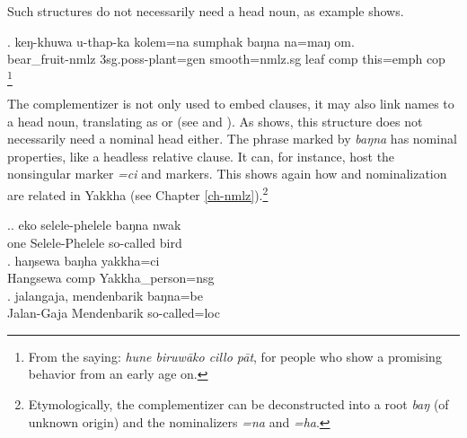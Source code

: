 Such structures do not necessarily need a head noun, as example \Next shows.

\exg. keŋ-khuwa            u-thap-ka              kolem=na         sumphak baŋna        na=maŋ     om.\\
bear\_fruit{\sc -nmlz} {\sc 3sg.poss-}plant{\sc =gen} smooth{\sc =nmlz.sg} leaf    comp this{\sc =emph} {\sc cop}\\
\footnote{From the  saying: \emph{hune biruwāko cillo pāt}, for people who show a promising behavior from an early age on.}



The complementizer is not only used to embed clauses, it may also link names to a head noun, translating as  or  (see \Next[a] and \Next[b]). As  \Next[c] shows, this structure does not necessarily need a nominal head either. The phrase marked by \emph{baŋna} has nominal properties, like a headless relative clause. It can, for instance, host the nonsingular marker \emph{=ci} and  markers. This shows again how  and nominalization are related in Yakkha (see Chapter \ref{ch-nmlz}).\footnote{Etymologically, the complementizer can be deconstructed into a root \emph{baŋ} (of unknown origin) and the nominalizers \emph{=na} and \emph{=ha}.}

\ex.\ag. eko selele-phelele baŋna nwak\\
one Selele-Phelele so-called bird\\
 
\bg. haŋsewa       baŋha         yakkha=ci\\
Hangsewa {\sc comp} Yakkha\_person{\sc =nsg}\\
 
\bg.   jalangaja, mendenbarik baŋna=be   \\
Jalan-Gaja Mendenbarik so-called{\sc =loc}\\
  


 	
